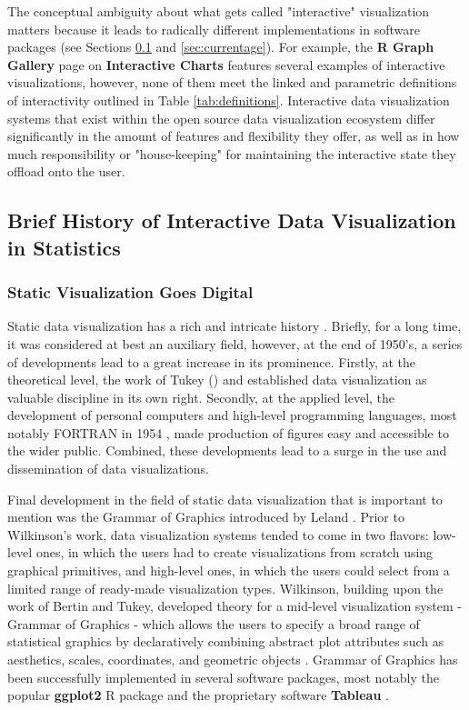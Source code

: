 \documentclass[12pt,a4paper]{article}
\begin{document}
The conceptual ambiguity about what gets called "interactive" visualization matters because it leads to radically different implementations in software packages (see Sections \ref{sec:briefhistory} and \ref{sec:currentage}). For example, the \textbf{R Graph Gallery} page on \textbf{Interactive Charts} \citep{holtz2022} features several examples of interactive visualizations, however, none of them meet the linked and parametric definitions of interactivity outlined in Table \ref{tab:definitions}. Interactive data visualization systems that exist within the open source data visualization ecosystem differ significantly in the amount of features and flexibility they offer, as well as in how much responsibility or "house-keeping" for maintaining the interactive state they offload onto the user.     

\subsection{Brief History of Interactive Data Visualization in Statistics}
\label{sec:briefhistory}

\subsubsection{Static Visualization Goes Digital}

Static data visualization has a rich and intricate history \citep[see e.g.][]{dix1998,chen2008, friendly2021,young2011}. Briefly, for a long time, it was considered at best an auxiliary field, however, at the end of 1950's, a series of developments lead to a great increase in its prominence. Firstly, at the theoretical level, the work of Tukey (\citeyear{tukey1962,tukey1977}) and \cite{bertin1967} established data visualization as valuable discipline in its own right. Secondly, at the applied level, the development of personal computers \citep[see e.g.][]{abbate1999} and high-level programming languages, most notably FORTRAN in 1954 \citep{backus1978}, made production of figures easy and accessible to the wider public. Combined, these developments lead to a surge in the use and dissemination of data visualizations.

Final development in the field of static data visualization that is important to mention was the Grammar of Graphics introduced by Leland \cite{wilkinson2012}. Prior to Wilkinson's work, data visualization systems tended to come in two flavors: low-level ones, in which the users had to create visualizations from scratch using graphical primitives, and high-level ones, in which the users could select from a limited range of ready-made visualization types. Wilkinson, building upon the work of Bertin and Tukey, developed theory for a mid-level visualization system - Grammar of Graphics - which allows the users to specify a broad range of statistical graphics by declaratively combining abstract plot attributes such as aesthetics, scales, coordinates, and geometric objects \citep{wilkinson2012}. Grammar of Graphics has been successfully implemented in several software packages, most notably the popular \textbf{ggplot2} R package \citep{wickham2010} and the proprietary software \textbf{Tableau} \citep{tableau2023}. 
\end{document}
